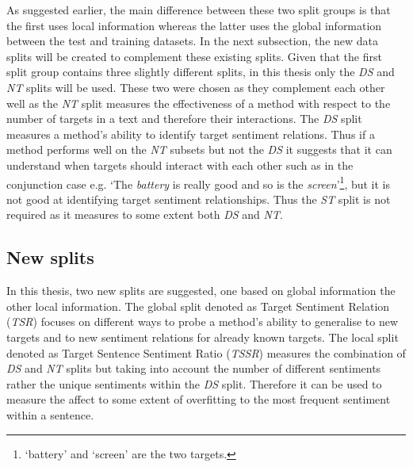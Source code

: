 As suggested earlier, the main difference between these two split groups is that the first uses local information whereas the latter uses the global information between the test and training datasets. In the next subsection, the new data splits will be created to complement these existing splits. Given that the first split group contains three slightly different splits, in this thesis only the \textit{DS} and \textit{NT} splits will be used. These two were chosen as they complement each other well as the \textit{NT} split measures the effectiveness of a method with respect to the number of targets in a text and therefore their interactions. The \textit{DS} split measures a method's ability to identify target sentiment relations. Thus if a method performs well on the \textit{NT} subsets but not the \textit{DS} it suggests that it can understand when targets should interact with each other such as in the conjunction case e.g. `The \textit{battery} is really good and so is the \textit{screen}'\footnote{`battery' and `screen' are the two targets.}, but it is not good at identifying target sentiment relationships. Thus the \textit{ST} split is not required as it measures to some extent both \textit{DS} and \textit{NT}.

\FloatBarrier
\subsection{New splits}
\label{section:error_analysis_new_splits}

In this thesis, two new splits are suggested, one based on global information the other local information. The global split denoted as Target Sentiment Relation (\textit{TSR}) focuses on different ways to probe a method's ability to generalise to new targets and to new sentiment relations for already known targets. The local split denoted as Target Sentence Sentiment Ratio (\textit{TSSR}) measures the combination of \textit{DS} and \textit{NT} splits but taking into account the number of different sentiments rather the unique sentiments within the \textit{DS} split. Therefore it can be used to measure the affect to some extent of overfitting to the most frequent sentiment within a sentence. 


